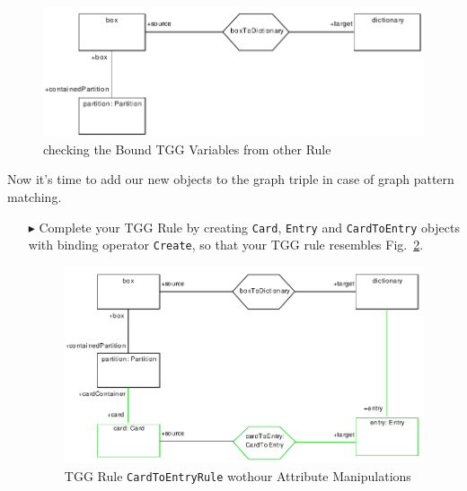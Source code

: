 \begin{enumerate}
\begin{figure}[htbp]
\begin{center}
  \includegraphics[width=\textwidth]{pics/tggBilder/tggRule/tgg18}
  \caption{checking the Bound TGG Variables from other Rule }  
  \label{fig:check_bound_variables}
\end{center}
\end{figure}

\end{enumerate}

Now it's time to add our new objects to the graph triple in case of graph pattern matching. 

\begin{enumerate}
\item[$\blacktriangleright$] Complete your TGG Rule by creating \texttt{Card}, \texttt{Entry} and \texttt{CardToEntry} objects with binding operator \texttt{Create}, so that your TGG rule resembles Fig.~\ref{fig:cardtoentry_1}.

\begin{figure}[htbp]
\begin{center}
  \includegraphics[width=\textwidth]{pics/tggBilder/tggRule/tgg19}
  \caption{TGG Rule \texttt{CardToEntryRule} wothour Attribute Manipulations}  
  \label{fig:cardtoentry_1}
\end{center}
\end{figure}

\end{enumerate}


